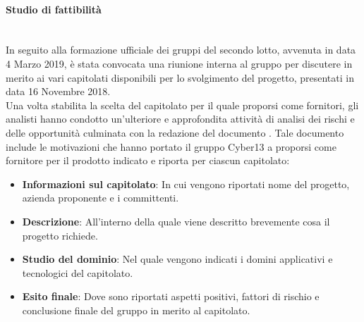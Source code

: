     \paragraph{Studio di fattibilità}
    ~\\
    In seguito alla formazione ufficiale dei gruppi del secondo lotto, avvenuta in data 4 Marzo 2019, è stata convocata una riunione interna al gruppo per discutere in merito ai vari capitolati disponibili per lo svolgimento del progetto, presentati in data 16 Novembre 2018.\\
    Una volta stabilita la scelta del capitolato per il quale proporsi come fornitori, gli analisti hanno condotto un’ulteriore e approfondita attività di analisi dei rischi e delle opportunità culminata con la redazione del documento \SdF .
    Tale documento include le motivazioni che hanno portato il gruppo Cyber13 a
    proporsi come fornitore per il prodotto indicato e riporta per ciascun capitolato:
    \begin{itemize}
        \item \textbf{Informazioni sul capitolato}: In cui vengono riportati nome del progetto, azienda proponente e i committenti.
        \item \textbf{Descrizione}: All'interno della quale viene descritto brevemente cosa il progetto richiede.
        \item \textbf{Studio del dominio}: Nel quale vengono indicati i domini applicativi e tecnologici del capitolato.
        \item \textbf{Esito finale}: Dove sono riportati aspetti positivi, fattori di rischio e conclusione finale del gruppo in merito al capitolato.
    \end{itemize}
    

